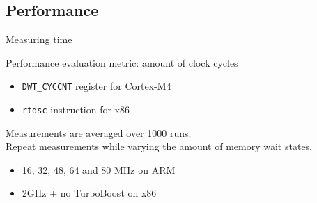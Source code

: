 \subsection{Performance}

\begin{frame}{Measuring time}
    \begin{block}{}
        Performance evaluation metric: amount of clock cycles
        \begin{itemize}
            \item \texttt{DWT\_CYCCNT} register for Cortex-M4
            \item \texttt{rtdsc} instruction for x86
        \end{itemize}
        Measurements are averaged over 1000 runs.\\
        Repeat measurements while varying the amount of memory wait states.
        \begin{itemize}
            \item 16, 32, 48, 64 and 80 MHz on ARM
            \item 2GHz + no TurboBoost on x86
        \end{itemize}
    \end{block}
\end{frame}

